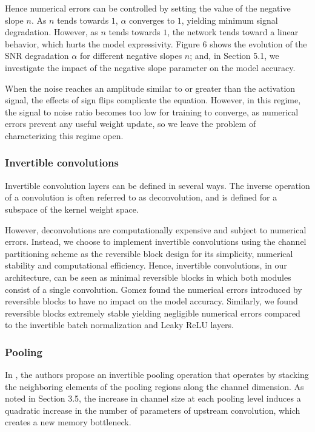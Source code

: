 \documentclass[twocolumn]{bmcart}
\begin{document}
Hence numerical errors can be controlled by setting the value of the negative slope $n$.
As $n$ tends towards $1$, $\alpha$ converges to $1$, yielding minimum signal degradation.
However, as $n$ tends towards $1$, the network tends toward a linear behavior, which hurts the model expressivity. 
Figure 6 shows the evolution of the SNR degradation $\alpha$ for different negative slopes $n$; 
and, in Section 5.1, we investigate the impact of the negative slope parameter on the model accuracy.

When the noise reaches an amplitude similar to or greater than the activation signal,
the effects of sign flips complicate the equation. 
However, in this regime, the signal to noise ratio becomes too low for training to converge,
as numerical errors prevent any useful weight update, so we leave the problem of characterizing this regime open.

\subsubsection{Invertible convolutions}

Invertible convolution layers can be defined in several ways.
The inverse operation of a convolution is often referred to as deconvolution,
and is defined for a subspace of the kernel weight space.

However, deconvolutions are computationally expensive and subject to numerical errors.
Instead, we choose to implement invertible convolutions using the channel partitioning scheme as the reversible block design for its simplicity, 
numerical stability and computational efficiency.
Hence, invertible convolutions, in our architecture, can be seen as minimal reversible blocks
 in which both modules consist of a single convolution.
Gomez \etal \cite{gomez2017reversible} found the numerical errors introduced by reversible blocks to have no impact on the model accuracy. 
Similarly, we found reversible blocks extremely stable yielding negligible numerical errors
compared to the invertible batch normalization and Leaky ReLU layers.

\subsubsection{Pooling}

In \cite{jacobsen2018revnet}, the authors propose an invertible pooling operation that operates
by stacking the neighboring elements of the pooling regions along the channel dimension.
As noted in Section 3.5, the increase in channel size at each pooling level 
induces a quadratic increase in the number of parameters of upstream convolution, which creates a new memory bottleneck.
\end{document}
